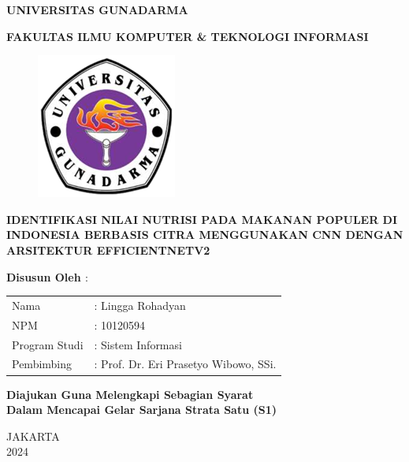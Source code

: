 \thispagestyle{empty}
\begin{singlespace}
    \begin{center}
    \fontsize{14}{16}\selectfont
    \textbf{UNIVERSITAS GUNADARMA}

    \vspace{0.25cm}
    
    \fontsize{14}{16}\selectfont
    \textbf{FAKULTAS ILMU KOMPUTER \& TEKNOLOGI INFORMASI}

    \vspace{0.2cm}
    
    \begin{figure}[h]
    \begin{center}\includegraphics[scale=1.5]{images/logo-gunadarma.png}
    \end{center}
    \end{figure}

    \vspace{0.2cm}
    
    \fontsize{14}{16}\selectfont
    \textbf{IDENTIFIKASI NILAI NUTRISI PADA MAKANAN POPULER DI INDONESIA BERBASIS CITRA MENGGUNAKAN CNN DENGAN ARSITEKTUR EFFICIENTNETV2}
    
    \end{center}
    \vspace{0.75cm}
    
    \begin{center}
    \bfseries
    {Disusun Oleh $:$}
    
    \vspace{0.5cm}
    \begin{tabular}{ll}
    Nama& : Lingga Rohadyan\tabularnewline NPM& : 10120594
    \tabularnewline Program Studi& : Sistem Informasi\tabularnewline
    Pembimbing& : Prof. Dr. Eri Prasetyo Wibowo, SSi.\tabularnewline
    \end{tabular}
    \end{center}
    \vspace{0.75cm}
    \begin{center}
    \bfseries
    Diajukan Guna Melengkapi Sebagian Syarat \\
    Dalam Mencapai Gelar Sarjana Strata Satu (S1)\\
    
    \vspace{1.5cm}
    
    JAKARTA\\
    2024 %
    
    \end{center}
\end{singlespace}

\pagebreak